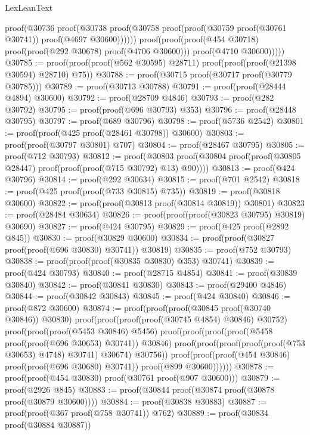 \begin{lexlean}{LexLeanText}
\begin{coremodule}
                proof(@30736
                    proof(@30738
                        proof(@30758
                            proof(proof(@30759 proof(@30761 @30741)) proof(@4697 @30600))))))
              proof(proof(proof(@454 @30718) proof(proof(@292 @30678) proof(@4706 @30600)))
                  proof(@4710 @30600)))))
@30785 := proof(proof(proof(@562 @30595) @28711) proof(proof(proof(@21398 @30594) @28710) @75))
@30788 := proof(@30715 proof(@30717 proof(@30779 @30785)))
@30789 := proof(@30713 @30788)
@30791 := proof(proof(@28444 @4894) @30600)
@30792 := proof(@28709 @4846)
@30793 := proof(@282 @30792)
@30795 := proof(proof(@696 @30793) @353)
@30796 := proof(@28448 @30795)
@30797 := proof(@689 @30796)
@30798 := proof(@5736 @2542)
@30801 := proof(proof(@425 proof(@28461 @30798)) @30600)
@30803 := proof(proof(@30797 @30801) @707)
@30804 := proof(@28467 @30795)
@30805 := proof(@712 @30793)
@30812 := proof(@30803
      proof(@30804 proof(proof(@30805 @28447) proof(proof(proof(@715 @30792) @13) @90))))
@30813 := proof(@424 @30796)
@30814 := proof(@292 @30634)
@30815 := proof(@701 @2542)
@30818 := proof(@425 proof(proof(@733 @30815) @735))
@30819 := proof(@30818 @30600)
@30822 := proof(proof(@30813 proof(@30814 @30819)) @30801)
@30823 := proof(@28484 @30634)
@30826 := proof(proof(proof(@30823 @30795) @30819) @30690)
@30827 := proof(@424 @30795)
@30829 := proof(@425 proof(@2892 @845))
@30830 := proof(@30829 @30600)
@30834 := proof(proof(@30827 proof(proof(@696 @30830) @30741)) @30819)
@30835 := proof(@752 @30793)
@30838 := proof(proof(proof(@30835 @30830) @353) @30741)
@30839 := proof(@424 @30793)
@30840 := proof(@28715 @4854)
@30841 := proof(@30839 @30840)
@30842 := proof(@30841 @30830)
@30843 := proof(@29400 @4846)
@30844 := proof(@30842 @30843)
@30845 := proof(@424 @30840)
@30846 := proof(@872 @30600)
@30874 := proof(proof(proof(@30845 proof(@30740 @30846)) @30830)
      proof(proof(proof(proof(@30745 @4854) @30846) @30752)
          proof(proof(proof(@5453 @30846) @5456)
              proof(proof(proof(proof(@5458 proof(proof(@696 @30653) @30741)) @30846)
                    proof(proof(proof(proof(proof(@753 @30653) @4748) @30741) @30674) @30756))
                  proof(proof(proof(@454 @30846) proof(proof(@696 @30680) @30741))
                      proof(@899 @30600))))))
@30878 := proof(proof(@454 @30830) proof(@30761 proof(@907 @30600)))
@30879 := proof(@2926 @845)
@30883 := proof(@30844 proof(@30874 proof(@30878 proof(@30879 @30600))))
@30884 := proof(@30838 @30883)
@30887 := proof(proof(@367 proof(@758 @30741)) @762)
@30889 := proof(@30834 proof(@30884 @30887))

\end{coremodule}
\end{lexlean}
